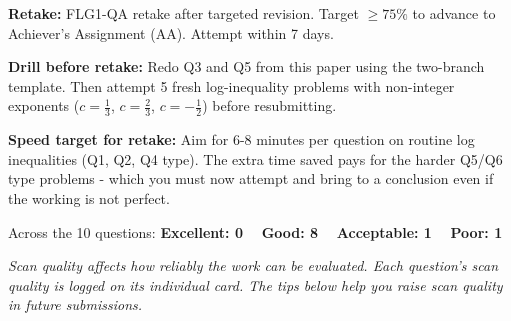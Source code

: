 \documentclass[11pt,a4paper]{article}
\begin{document}
\par\vspace{0.2cm}

\begin{tspoints}
    \item \textbf{Retake:} FLG1-QA retake after targeted revision. Target $\geq 75\%$ to advance to Achiever's Assignment (AA). Attempt within 7 days.
    \item \textbf{Drill before retake:} Redo Q3 and Q5 from this paper using the two-branch template. Then attempt 5 fresh log-inequality problems with non-integer exponents ($c = \tfrac{1}{3}$, $c = \tfrac{2}{3}$, $c = -\tfrac{1}{2}$) before resubmitting.
    \item \textbf{Speed target for retake:} Aim for 6-8 minutes per question on routine log inequalities (Q1, Q2, Q4 type). The extra time saved pays for the harder Q5/Q6 type problems - which you must now attempt and bring to a conclusion even if the working is not perfect.
\end{tspoints}


\tsDisclaimer

\tsSignature


\newpage



Across the 10 questions: \textbf{\color{tsGreen}Excellent: 0} \ \textperiodcentered\ \textbf{\color{tsBlue}Good: 8} \ \textperiodcentered\ \textbf{\color{tsAmber}Acceptable: 1} \ \textperiodcentered\ \textbf{\color{tsRed}Poor: 1}

\par\vspace{0.1cm}
{\fontsize{9pt}{12pt}\selectfont\color{tsGrey}\textit{Scan quality affects how reliably the work can be evaluated. Each question's scan quality is logged on its individual card. The tips below help you raise scan quality in future submissions.}}

\end{document}
